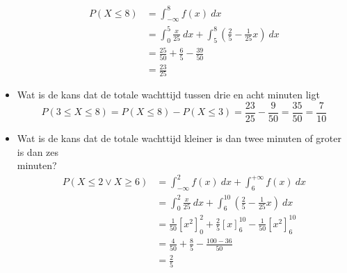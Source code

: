 \documentclass[main.tex]{subfiles}
\begin{document}
\begin{oef}
\begin{itemize}
\[\begin{array}{rl}
      P(X \le 8)
      &= \int_{-\infty}^{8}f(x)\ dx\\
      &= \int_{0}^{5}\frac{x}{25}\ dx + \int_{5}^{8}\left(\frac{2}{5}-\frac{1}{25}x\right)\ dx\\
      &= \frac{25}{50} + \frac{6}{5} - \frac{39}{50}\\
      &= \frac{23}{25}
    \end{array}
    \]
  \item Wat is de kans dat de totale wachttijd tussen drie en acht minuten ligt\\
    \[ P(3 \le X \le 8) = P(X \le 8) - P(X \le 3) = \frac{23}{25}-\frac{9}{50} = \frac{35}{50} = \frac{7}{10} \]
  \item Wat is de kans dat de totale wachttijd kleiner is dan twee minuten of groter is dan zes\\
    minuten?
    \[
    \begin{array}{rl}
      P(X \le 2 \vee X \ge 6)
      &= \int_{-\infty}^{2}f(x)\ dx + \int_{6}^{+\infty}f(x)\ dx\\
      &= \int_{0}^{2}\frac{x}{25}\ dx + \int_{6}^{10}\left(\frac{2}{5}-\frac{1}{25}x\right)\ dx\\
      &= \frac{1}{50}\left[x^{2}\right]_{0}^{2} + \frac{2}{5}\left[x\right]_{6}^{10}-\frac{1}{50}\left[x^{2}\right]_{6}^{10}\\
      &= \frac{4}{50} + \frac{8}{5} - \frac{100 -36}{50}\\
      &= \frac{2}{5}
    \end{array}
    \]
  \end{itemize}
\end{oef}
\end{document}
